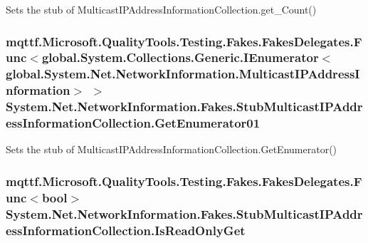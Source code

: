 Sets the stub of Multicast\-I\-P\-Address\-Information\-Collection.\-get\-\_\-\-Count()

\hypertarget{class_system_1_1_net_1_1_network_information_1_1_fakes_1_1_stub_multicast_i_p_address_information_collection_ad843900c66b0bc5534cf8290c22e0928}{
\subsubsection[{Get\-Enumerator01}]{\setlength{\rightskip}{0pt plus 5cm}mqttf.\-Microsoft.\-Quality\-Tools.\-Testing.\-Fakes.\-Fakes\-Delegates.\-Func$<$global.\-System.\-Collections.\-Generic.\-I\-Enumerator$<$global.\-System.\-Net.\-Network\-Information.\-Multicast\-I\-P\-Address\-Information$>$ $>$ System.\-Net.\-Network\-Information.\-Fakes.\-Stub\-Multicast\-I\-P\-Address\-Information\-Collection.\-Get\-Enumerator01}}\label{class_system_1_1_net_1_1_network_information_1_1_fakes_1_1_stub_multicast_i_p_address_information_collection_ad843900c66b0bc5534cf8290c22e0928}


Sets the stub of Multicast\-I\-P\-Address\-Information\-Collection.\-Get\-Enumerator()

\hypertarget{class_system_1_1_net_1_1_network_information_1_1_fakes_1_1_stub_multicast_i_p_address_information_collection_a73d4e807043c15dbb5c2fae094c68d6a}{
\subsubsection[{Is\-Read\-Only\-Get}]{\setlength{\rightskip}{0pt plus 5cm}mqttf.\-Microsoft.\-Quality\-Tools.\-Testing.\-Fakes.\-Fakes\-Delegates.\-Func$<$bool$>$ System.\-Net.\-Network\-Information.\-Fakes.\-Stub\-Multicast\-I\-P\-Address\-Information\-Collection.\-Is\-Read\-Only\-Get}}\label{class_system_1_1_net_1_1_network_information_1_1_fakes_1_1_stub_multicast_i_p_address_information_collection_a73d4e807043c15dbb5c2fae094c68d6a}


